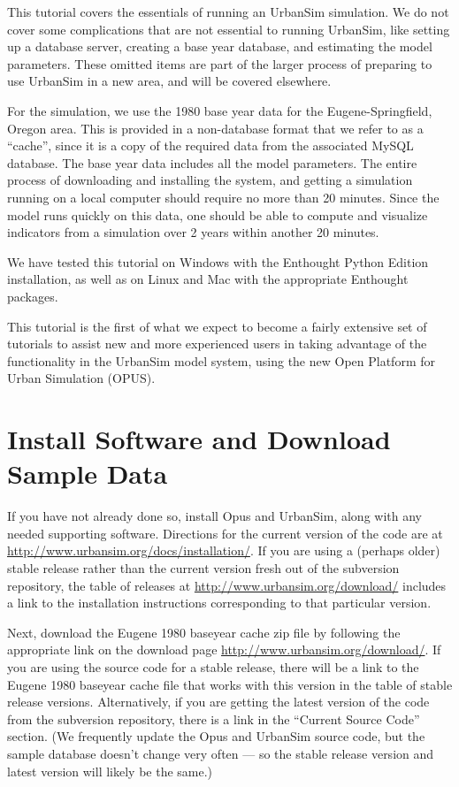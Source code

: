 \documentclass{howto}
\begin{document}
This tutorial covers the essentials of running an UrbanSim simulation.
We do not cover some complications that are not essential to running
UrbanSim, like setting up a database server, creating a base year database, and
estimating the model parameters.  These omitted items are part of the larger
process of preparing to use UrbanSim in a new area, and will be covered
elsewhere.

For the simulation, we use the 1980 base year data for the
Eugene-Springfield, Oregon area.  This is provided in a non-database
format that we refer to as a ``cache'', since it is a copy of the
required data from the associated MySQL database. The base year data
includes all the model parameters.  The entire process of
downloading and installing the system, and getting a simulation
running on a local computer should require no more than 20 minutes.
Since the model runs quickly on this data, one should be able to
compute and visualize indicators from a simulation over 2 years
within another 20 minutes.

We have tested this tutorial on Windows with the Enthought Python Edition
installation, as well as on Linux and Mac with the appropriate Enthought
packages.

This tutorial is the first of what we expect to become a fairly extensive
set of tutorials to assist new and more experienced users in taking
advantage of the functionality in the UrbanSim model system, using
the new Open Platform for Urban Simulation (OPUS).

\section*{Install Software and Download Sample Data}

If you have not already done so, install Opus and UrbanSim, along with
any needed supporting software.  Directions for the current version of
the code are at \url{http://www.urbansim.org/docs/installation/}.  If
you are using a (perhaps older) stable release rather than the current
version fresh out of the subversion repository, the table of releases
at \url{http://www.urbansim.org/download/} includes a link to the installation
instructions corresponding to that particular version.

Next, download the Eugene 1980 baseyear cache zip file by following the 
appropriate link on the download page \url{http://www.urbansim.org/download/}.
If you are using the source code for a stable release, there will be a link
to the Eugene 1980 baseyear cache file that works with this version in the table
of stable release versions.  Alternatively, if you are getting the latest version
of the code from the subversion repository, there is a link in the ``Current Source Code''
section.  (We frequently update the Opus and UrbanSim source code, but the sample database
doesn't change very often --- so the stable release version and latest version will likely 
be the same.)
\end{document}
